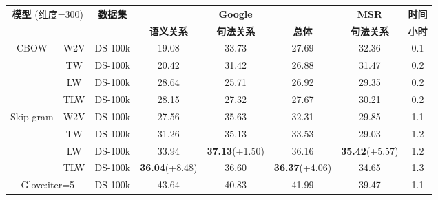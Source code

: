 \documentclass[master]{njuthesis}
\begin{document}
\begin{itemize}
\begin{table}[htbp]
\begin{center}
\begin{tabular}{|c|c|c|c|c|c|c|c|}
\hline
\multicolumn{2}{|c|}{\multirow{2}{*}{\textbf{模型} (维度=300)}} & \multirow{2}{*}{\textbf{数据集}} & \multicolumn{3}{c|}{\textbf{Google}}                      & \textbf{MSR}       & \textbf{时间} \\ \cline{4-8} 
\multicolumn{2}{|c|}{}                                 &                       & \textbf{语义关系} & \textbf{句法关系} & \textbf{总体}   & \textbf{句法关系} & \textbf{小时} \\ \hline
\multirow{4}{*}{CBOW}                   & W2V          & DS-100k             & 19.08           & 33.73            & 27.69          & 32.36            & 0.1             \\ \cline{2-8} 
                                        & TW           & DS-100k             & 20.42           & 31.42            & 26.88          & 31.47            & 0.2             \\ \cline{2-8} 
                                        & LW           & DS-100k             & 28.64           & 25.71            & 26.92          & 29.35            & 0.2             \\ \cline{2-8} 
                                        & TLW          & DS-100k             & 28.15           & 27.32            & 27.67          & 30.21            & 0.2             \\ \hline
\multirow{4}{*}{Skip-gram}              & W2V          & DS-100k             & 27.56           & 35.63            & 32.31          & 29.85            & 1.1            \\ \cline{2-8} 
                                        & TW           & DS-100k             & 31.26           & 35.13            & 33.53          & 29.03            & 1.2            \\ \cline{2-8} 
                                        & LW           & DS-100k             & 33.94           & \textbf{37.13}(+1.50)    & 36.16          & \textbf{35.42}(+5.57)    & 1.2            \\ \cline{2-8} 
                                        & TLW          & DS-100k             & \textbf{36.04}(+8.48)   & 36.60            & \textbf{36.37}(+4.06)  & 34.65            & 1.3            \\ \hline
\multicolumn{2}{|c|}{Glove:iter=5} 							 & DS-100k             & 43.64           & 40.83             & 41.99          & 39.47             & 1.1            \\ \hline 	

\end{tabular}
\end{center}
\end{table}
\end{itemize}
\end{document}
